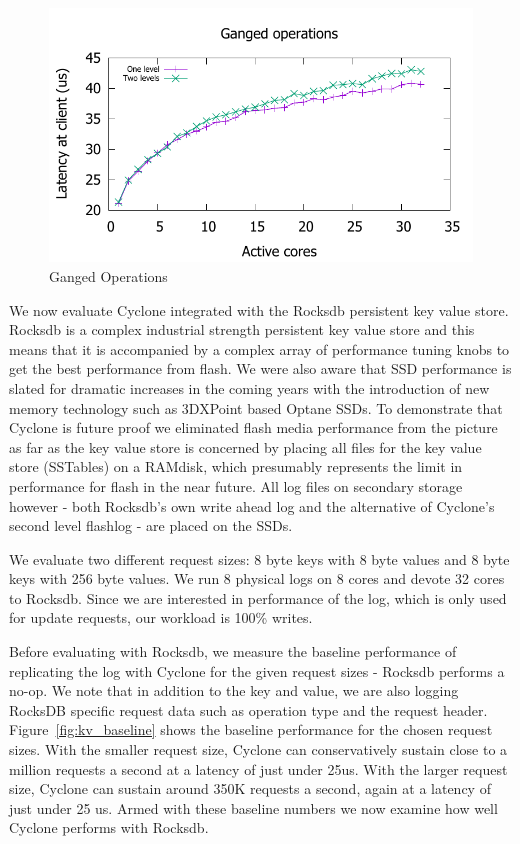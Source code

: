\documentclass[pageno]{jpaper}
\begin{document}
\begin{figure}
\includegraphics[scale=0.6]{results2/multi.pdf}
\caption{Ganged Operations}
\label{fig:ganged}
\end{figure}

We now evaluate Cyclone integrated with the Rocksdb persistent key value
store. Rocksdb is a complex industrial strength persistent key value store and
this means that it is accompanied by a complex array of performance tuning knobs
to get the best performance from flash. We were also aware that SSD performance
is slated for dramatic increases in the coming years with the introduction of
new memory technology such as 3DXPoint based Optane SSDs. To demonstrate that
Cyclone is future proof we eliminated flash media performance from the picture
as far as the key value store is concerned by placing all files for the key
value store (SSTables) on a RAMdisk, which presumably represents the limit in
performance for flash in the near future. All log files on secondary storage
however - both Rocksdb's own write ahead log and the alternative of Cyclone's
second level flashlog - are placed on the SSDs.

We evaluate two different request sizes: 8 byte keys with 8 byte values and 8
byte keys with 256 byte values. We run 8 physical logs on 8 cores and devote 32
cores to Rocksdb. Since we are interested in performance of the log, which is
only used for update requests, our workload is 100\% writes.

Before evaluating with Rocksdb, we measure the baseline performance of
replicating the log with Cyclone for the given request sizes - Rocksdb performs
a no-op. We note that in addition to the key and value, we are also logging
RocksDB specific request data such as operation type and the request header.
Figure~\ref{fig:kv_baseline} shows the baseline performance for the chosen
request sizes. With the smaller request size, Cyclone can conservatively sustain
close to a million requests a second at a latency of just under 25us. With the
larger request size, Cyclone can sustain around 350K requests a second, again at
a latency of just under 25 us. Armed with these baseline numbers we now examine
how well Cyclone performs with Rocksdb.
\end{document}
